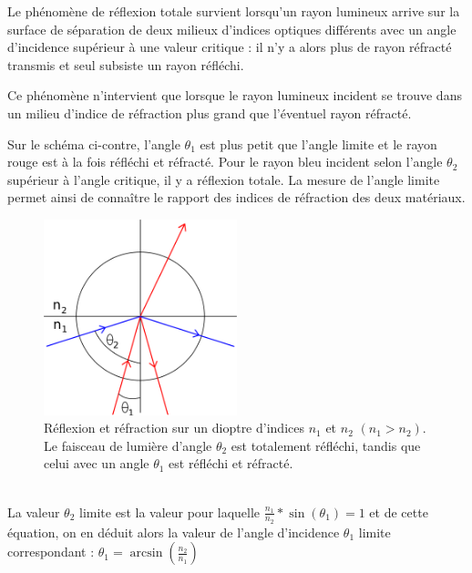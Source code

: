 \documentclass[a4paper,11pt]{article}
\begin{document}
\begin{defi}
Le phénomène de réflexion totale survient lorsqu'un rayon lumineux arrive sur la surface de séparation de deux milieux d'indices optiques différents avec un angle d'incidence supérieur à une valeur critique : il n'y a alors plus de rayon réfracté transmis et seul subsiste un rayon réfléchi.

Ce phénomène n'intervient que lorsque le rayon lumineux incident se trouve dans un milieu d'indice de réfraction plus grand que l'éventuel rayon réfracté.

Sur le schéma ci-contre, l'angle $\theta_1$ est plus petit que l'angle limite et le rayon rouge est à la fois réfléchi et réfracté. Pour le rayon bleu incident selon l'angle $\theta_2$ supérieur à l'angle critique, il y a réflexion totale. La mesure de l'angle limite permet ainsi de connaître le rapport des indices de réfraction des deux matériaux.
\begin{figure}[h]
  \caption{Réflexion et réfraction sur un dioptre d'indices $n_1$ et $n_2$ $(n_1 > n_2)$. Le faisceau de lumière d'angle $\theta_2$ est totalement réfléchi, tandis que celui avec un angle $\theta_1$ est réfléchi et réfracté.}
  \centering
  \includegraphics[width=0.5\textwidth]{Réflexion_totale}
\end{figure}
\\ La valeur $\theta_2$ limite est la valeur pour laquelle $\frac{n_1}{n_2}*\sin(\theta_1)=1$ et de cette équation, on en déduit alors la valeur de l'angle d'incidence $\theta_1$ limite correspondant : $\theta_1 = \arcsin(\frac{n_2}{n_1})$
\end{defi}
\end{document}
